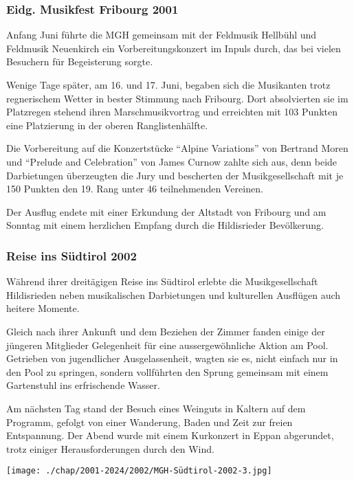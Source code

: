 \begin{history}
    \subsubsection*{Eidg. Musikfest Fribourg 2001}

    Anfang Juni führte die MGH gemeinsam mit der Feldmusik Hellbühl und
    Feldmusik Neuenkirch ein Vorbereitungskonzert im Inpuls durch, das bei
    vielen Besuchern für Begeisterung sorgte.

    Wenige Tage später, am 16. und 17. Juni, begaben sich die Musikanten trotz
    regnerischem Wetter in bester Stimmung nach Fribourg. Dort absolvierten sie
    im Platzregen stehend ihren Marschmusikvortrag und erreichten mit 103
    Punkten eine Platzierung in der oberen Ranglistenhälfte.

    Die Vorbereitung auf die Konzertstücke \enquote{Alpine Variations} von
    Bertrand Moren und \enquote{Prelude and Celebration} von James Curnow zahlte
    sich aus, denn beide Darbietungen überzeugten die Jury und bescherten der
    Musikgesellschaft mit je 150 Punkten den 19. Rang unter 46 teilnehmenden
    Vereinen.

    Der Ausflug endete mit einer Erkundung der Altstadt von Fribourg und am
    Sonntag mit einem herzlichen Empfang durch die Hildisrieder Bevölkerung.

    \subsubsection*{Reise ins Südtirol 2002}
    Während ihrer dreitägigen Reise ins Südtirol erlebte die Musikgesellschaft
    Hildisrieden neben musikalischen Darbietungen und kulturellen Ausflügen auch
    heitere Momente.

    Gleich nach ihrer Ankunft und dem Beziehen der Zimmer fanden einige der
    jüngeren Mitglieder Gelegenheit für eine aussergewöhnliche Aktion am Pool.
    Getrieben von jugendlicher Ausgelassenheit, wagten sie es, nicht einfach nur
    in den Pool zu springen, sondern vollführten den Sprung gemeinsam mit einem
    Gartenstuhl ins erfrischende Wasser.

    Am nächsten Tag stand der Besuch eines Weinguts in Kaltern auf dem Programm,
    gefolgt von einer Wanderung, Baden und Zeit zur freien Entspannung. Der
    Abend wurde mit einem Kurkonzert in Eppan abgerundet, trotz einiger
    Herausforderungen durch den Wind.

    \begin{MulticolFigure}
        \centering
        \texttt{[image: ./chap/2001-2024/2002/MGH-Südtirol-2002-3.jpg]}
    \end{MulticolFigure}


\end{history}
